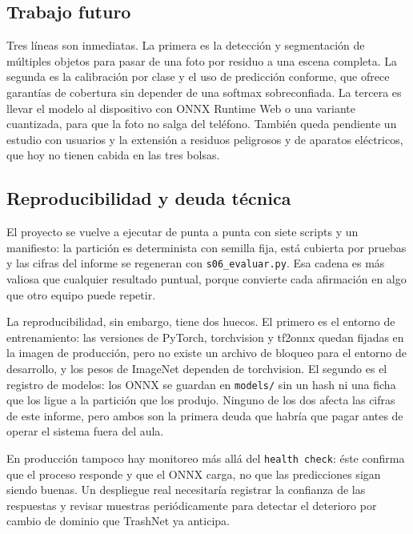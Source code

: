 \documentclass[10pt]{ieeeconf}
\begin{document}
\subsection{Trabajo futuro}

Tres l\'ineas son inmediatas. La primera es la detecci\'on y segmentaci\'on de
m\'ultiples objetos para pasar de una foto por residuo a una escena completa. La
segunda es la calibraci\'on por clase y el uso de predicci\'on conforme, que
ofrece garant\'ias de cobertura sin depender de una softmax sobreconfiada. La
tercera es llevar el modelo al dispositivo con ONNX Runtime Web o una variante
cuantizada, para que la foto no salga del tel\'efono. Tambi\'en queda pendiente un
estudio con usuarios y la extensi\'on a residuos peligrosos y de aparatos
el\'ectricos, que hoy no tienen cabida en las tres bolsas.

\subsection{Reproducibilidad y deuda t\'ecnica}

El proyecto se vuelve a ejecutar de punta a punta con siete scripts y un
manifiesto: la partici\'on es determinista con semilla fija, est\'a cubierta por
pruebas y las cifras del informe se regeneran con \texttt{s06\_evaluar.py}. Esa
cadena es m\'as valiosa que cualquier resultado puntual, porque convierte cada
afirmaci\'on en algo que otro equipo puede repetir.

La reproducibilidad, sin embargo, tiene dos huecos. El primero es el entorno de
entrenamiento: las versiones de PyTorch, torchvision y tf2onnx quedan fijadas en
la imagen de producci\'on, pero no existe un archivo de bloqueo para el entorno de
desarrollo, y los pesos de ImageNet dependen de torchvision. El segundo es el
registro de modelos: los ONNX se guardan en \texttt{models/} sin un hash ni una
ficha que los ligue a la partici\'on que los produjo. Ninguno de los dos afecta
las cifras de este informe, pero ambos son la primera deuda que habr\'ia que
pagar antes de operar el sistema fuera del aula.

En producci\'on tampoco hay monitoreo m\'as all\'a del \texttt{health check}:
\'este confirma que el proceso responde y que el ONNX carga, no que las
predicciones sigan siendo buenas. Un despliegue real necesitar\'ia registrar la
confianza de las respuestas y revisar muestras peri\'odicamente para detectar el
deterioro por cambio de dominio que TrashNet ya anticipa.

\end{document}
